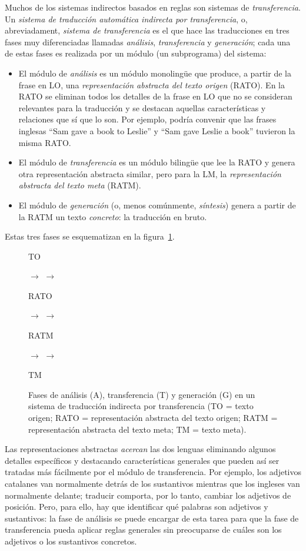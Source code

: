 Muchos de los sistemas indirectos basados en reglas son sistemas de \emph{transferencia}. Un \emph{sistema de traducción automática indirecta por transferencia}, o, abreviadament, \emph{sistema de transferencia} es el que hace las traducciones en tres fases muy diferenciadas llamadas \emph{análisis}, \emph{transferencia} y \emph{generación}; cada una de estas fases es realizada por un módulo (un subprograma) del sistema: \begin{itemize} \item El módulo de \emph{análisis} es un módulo monolingüe que produce, a partir de la frase en LO, una \emph{representación abstracta del texto origen} (RATO). En la RATO se eliminan todos los detalles de la frase en LO que no se consideran relevantes para la traducción y se destacan aquellas características y relaciones que sí que lo son. Por ejemplo, podría convenir que las frases inglesas ``Sam gave a book to Leslie'' y ``Sam gave Leslie a book'' \citep{arnold93j} tuvieron la misma RATO. \item El módulo de \emph{transferencia} es un módulo bilingüe que lee la RATO y genera otra representación abstracta similar, pero para la LM, la \emph{representación abstracta del texto meta} (RATM). \item El módulo de \emph{generación} (o, menos comúnmente, \emph{síntesis}) genera a partir de la RATM un texto \emph{concreto}: la traducción en bruto. \end{itemize} Estas tres fases se esquematizan en la figura~\ref{fg:transfer}. 

\begin{figure} \begin{center} \parbox{0.5cm}{TO} $\to$  $\to$ \parbox{1.0cm}{RATO} $\to$  $\to$ \parbox{1.25cm}{RATM} $\to$  $\to$ \parbox{0.5cm}{TM} \end{center} \caption{Fases de análisis (A), transferencia (T) y generación (G) en un sistema de traducción indirecta por transferencia (TO = texto origen; RATO = representación abstracta del texto origen; RATM = representación abstracta del texto meta; TM = texto meta).} \label{fg:transfer} \end{figure} 

Las representaciones abstractas \emph{acercan} las dos lenguas eliminando algunos detalles específicos y destacando características generales que pueden así ser tratadas más fácilmente por el módulo de transferencia. Por ejemplo, los adjetivos catalanes van normalmente detrás de los sustantivos mientras que los ingleses van normalmente delante; traducir comporta, por lo tanto, cambiar los adjetivos de posición. Pero, para ello, hay que identificar qué palabras son adjetivos y sustantivos: la fase de análisis se puede encargar de esta tarea para que la fase de transferencia pueda aplicar reglas generales sin preocuparse de cuáles son los adjetivos o los sustantivos concretos. 


